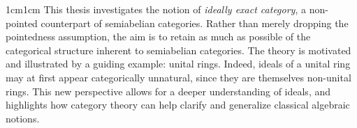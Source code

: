 \begin{Abstract}
    \begin{changemargin}{1cm}{1cm}
    \fontsize{12}{14.5}\selectfont
    This thesis investigates the notion of \textit{ideally exact category}, a non-pointed
    counterpart of semiabelian categories. Rather than merely dropping the
    pointedness assumption, the aim is to retain as much as possible of the
    categorical structure inherent to semiabelian categories. The theory is motivated and illustrated by a guiding example: unital rings. Indeed, ideals
    of a unital ring may at first appear categorically unnatural, since they are
    themselves non-unital rings. This new perspective allows for a deeper understanding of ideals, and highlights how category theory can help clarify
    and generalize classical algebraic notions.
    \end{changemargin}
\end{Abstract}